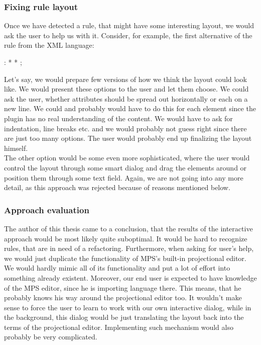 \subsubsection{Fixing rule layout}

Once we have detected a rule, that might have some interesting layout, we would ask the user to help us with it.
Consider, for example, the first alternative of the  rule from the XML language:

\begin{antlr}
	  :   \literal{<}  * \literal{>} * \literal{</}  \literal{>} ;
\end{antlr}

Let's say, we would prepare few versions of how we think the layout could look like.
We would present these options to the user and let them choose.
We could ask the user, whether attributes should be spread out horizontally or each on a new line.
We could and probably would have to do this for each element since the plugin has no real understanding of the content.
We would have to ask for indentation, line breaks etc. and we would probably not guess right since there are just too many options.
The user would probably end up finalizing the layout himself.
\\

The other option would be some even more sophisticated, where the user would control the layout through some smart dialog and drag the elements around or position them through some text field.
Again, we are not going into any more detail, as this approach was rejected because of reasons mentioned below.

\subsubsection{Approach evaluation}
\label{chap:interactive_approach_evaluation}

The author of this thesis came to a conclusion, that the results of the interactive approach would be most likely quite suboptimal.
It would be hard to recognize rules, that are in need of a refactoring.
Furthermore, when asking for user's help, we would just duplicate the functionality of MPS's built-in projectional editor.
We would hardly mimic all of its functionality and put a lot of effort into something already existent.
Moreover, our end user is expected to have knowledge of the MPS editor, since he is importing language there.
This means, that he probably knows his way around the projectional editor too.
It wouldn't make sense to force the user to learn to work with our own interactive dialog, while in the background, this dialog would be just translating the layout back into the terms of the projectional editor.
Implementing such mechanism would also probably be very complicated.

